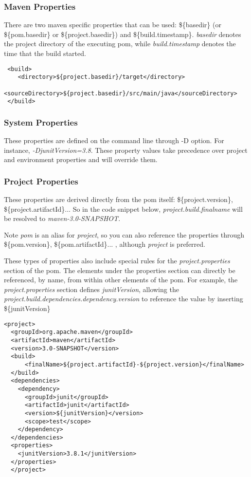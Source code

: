 \documentclass[12pt]{amsart}
\begin{document}
\subsubsection{Maven Properties}
There are two maven specific properties that can be used: \$\{basedir\} (or \$\{pom.basedir\} or \$\{project.basedir\}) and \$\{build.timestamp\}. \emph{basedir} denotes the project directory of the executing pom, while\emph{ build.timestamp} denotes the time that the build started.

\begin{verbatim}
 <build>
    <directory>${project.basedir}/target</directory>
    <sourceDirectory>${project.basedir}/src/main/java</sourceDirectory>
 </build>
\end{verbatim}


\subsubsection{System Properties}
These properties are defined on the command line through -D option. For instance, \emph{-DjunitVersion=3.8}. These property values take precedence over project and environment properties and will override them.

\subsubsection{Project Properties}  These properties are derived directly from the pom itself: \$\{project.version\}, \$\{project.artifactId\}... So in the code snippet below, \emph{project.build.finalname} will be resolved to\emph{ maven-3.0-SNAPSHOT}. 

Note \emph{pom} is an alias for\emph{ project}, so you can also reference the properties through \$\{pom.version\}, \$\{pom.artifactId\}... , although \emph{project} is preferred.

These types of properties also include special rules for the \emph{project.properties }section of the pom. The elements under the properties section can directly be referenced, by name, from within other elements of the pom. For example, the \emph{project.properties }section defines \emph{junitVersion}, allowing the 
\emph{ project.build.dependencies.dependency.version} to reference the value by inserting \$\{junitVersion\}

\begin{verbatim}
<project>
  <groupId>org.apache.maven</groupId>
  <artifactId>maven</artifactId>
  <version>3.0-SNAPSHOT</version>
  <build>
      <finalName>${project.artifactId}-${project.version}</finalName>
  </build>
  <dependencies>
    <dependency>
      <groupId>junit</groupId>
      <artifactId>junit</artifactId>
      <version>${junitVersion}</version>
      <scope>test</scope>
    </dependency>
  </dependencies>
  <properties>
    <junitVersion>3.8.1</junitVersion>
  </properties>
  </project>
\end{verbatim}
\end{document}
